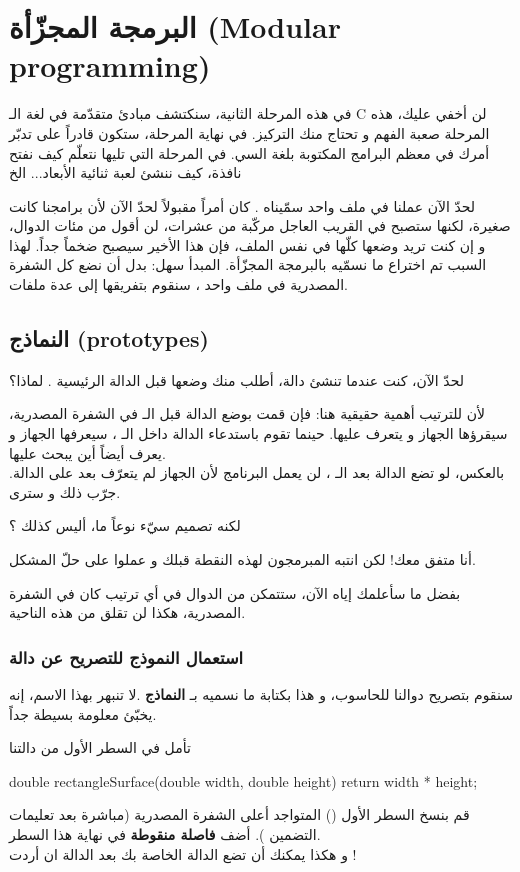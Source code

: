 \chapter{البرمجة المجزّأة
(\textenglish{Modular programming})}
في هذه المرحلة الثانية، سنكتشف مبادئ متقدّمة في لغة الـ
\textenglish{C}
 لن أخفي عليك، هذه المرحلة صعبة الفهم و تحتاج منك التركيز. في نهاية المرحلة، ستكون قادراً على تدبّر أمرك في معظم البرامج المكتوبة بلغة السي. في المرحلة التي تليها نتعلّم كيف نفتح نافذة، كيف ننشئ لعبة ثنائية الأبعاد... الخ

لحدّ الآن عملنا في ملف واحد سمّيناه
. كان أمراً مقبولاً لحدّ الآن لأن برامجنا كانت صغيرة، لكنها ستصبح في القريب العاجل مركّبة من عشرات، لن أقول من مئات الدوال، و إن كنت تريد وضعها كلّها في نفس الملف، فإن هذا الأخير سيصبح ضخماً جداً. لهذا السبب تم اختراع ما نسمّيه بالبرمجة المجزّأة. المبدأ سهل: بدل أن نضع كل الشفرة المصدرية في ملف واحد
، سنقوم بتفريقها إلى عدة ملفات.

\section{النماذج (\textenglish{prototypes})}
لحدّ الآن، كنت عندما تنشئ دالة، أطلب منك وضعها قبل الدالة الرئيسية
. لماذا؟

لأن للترتيب أهمية حقيقية هنا: فإن قمت بوضع الدالة قبل الـ
في الشفرة المصدرية، سيقرؤها الجهاز و يتعرف عليها. حينما تقوم باستدعاء الدالة داخل الـ
، سيعرفها الجهاز و يعرف أيضاً أين يبحث عليها.\\
بالعكس، لو تضع الدالة بعد الـ
، لن يعمل البرنامج لأن الجهاز لم يتعرّف بعد على الدالة. جرّب ذلك و سترى.
\begin{question}
  لكنه تصميم سيّء نوعاً ما، أليس كذلك ؟
\end{question}
أنا متفق معك! لكن انتبه المبرمجون لهذه النقطة قبلك و عملوا على حلّ المشكل.

بفضل ما سأعلمك إياه الآن، ستتمكن من الدوال في أي ترتيب كان في الشفرة المصدرية، هكذا لن تقلق من هذه الناحية.

\subsection{استعمال النموذج للتصريح عن دالة}
سنقوم بتصريح دوالنا للحاسوب، و هذا بكتابة ما نسميه بـ
\textbf{النماذج}
.لا تنبهر بهذا الاسم، إنه يخبّئ معلومة بسيطة جداً.

تأمل في السطر الأول من دالتنا
\begin{Csource}
double rectangleSurface(double width, double height)
{
	return width * height;
}
\end{Csource}
قم بنسخ السطر الأول
()
المتواجد أعلى الشفرة المصدرية (مباشرة بعد تعليمات التضمين
). أضف
\textbf{فاصلة منقوطة}
في نهاية هذا السطر.\\
و هكذا يمكنك أن تضع الدالة الخاصة بك
بعد الدالة
ان أردت !

